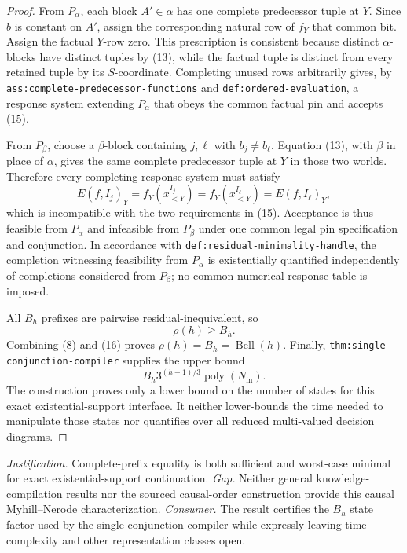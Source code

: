 \documentclass{article}
\begin{document}
\begin{proof}
From \(P_\alpha\), each block \(A'\in\alpha\) has one complete predecessor tuple at \(Y\).  Since \(b\) is constant on \(A'\), assign the corresponding natural row of \(f_Y\) that common bit.  Assign the factual \(Y\)-row zero.  This prescription is consistent because distinct \(\alpha\)-blocks have distinct tuples by (13), while the factual tuple is distinct from every retained tuple by its \(S\)-coordinate.  Completing unused rows arbitrarily gives, by \texttt{ass:complete-predecessor-functions} and \texttt{def:ordered-evaluation}, a response system extending \(P_\alpha\) that obeys the common factual pin and accepts (15).

From \(P_\beta\), choose a \(\beta\)-block containing \(j,\ell\) with \(b_j\neq b_\ell\).  Equation (13), with \(\beta\) in place of \(\alpha\), gives the same complete predecessor tuple at \(Y\) in those two worlds.  Therefore every completing response system must satisfy
\[
 E(f,I_j)_Y=f_Y(x^{I_j}_{<Y})
 =f_Y(x^{I_\ell}_{<Y})=E(f,I_\ell)_Y,
\]
which is incompatible with the two requirements in (15).  Acceptance is thus feasible from \(P_\alpha\) and infeasible from \(P_\beta\) under one common legal pin specification and conjunction.  In accordance with \texttt{def:residual-minimality-handle}, the completion witnessing feasibility from \(P_\alpha\) is existentially quantified independently of completions considered from \(P_\beta\); no common numerical response table is imposed.

All \(B_h\) prefixes are pairwise residual-inequivalent, so
\[
 \rho(h)\geq B_h.
\tag{16}
\]
Combining (8) and (16) proves \(\rho(h)=B_h=\operatorname{Bell}(h)\).  Finally, \texttt{thm:single-conjunction-compiler} supplies the upper bound
\[
 B_h3^{(h-1)/3}\operatorname{poly}(N_{\mathrm{in}}).
\]
The construction proves only a lower bound on the number of states for this exact existential-support interface.  It neither lower-bounds the time needed to manipulate those states nor quantifies over all reduced multi-valued decision diagrams.
\end{proof}
\par\smallskip\noindent \textit{Justification.} Complete-prefix equality is both sufficient and worst-case minimal for exact existential-support continuation. \textit{Gap.} Neither general knowledge-compilation results nor the sourced causal-order construction provide this causal Myhill--Nerode characterization. \textit{Consumer.} The result certifies the \(B_h\) state factor used by the single-conjunction compiler while expressly leaving time complexity and other representation classes open.
\end{document}
